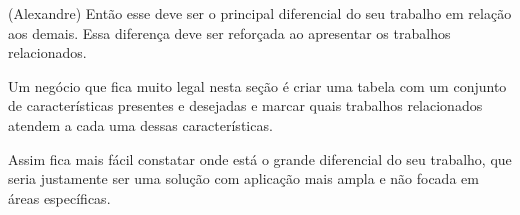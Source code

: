 (Alexandre) Então esse deve ser o principal diferencial do seu trabalho em relação aos demais. Essa diferença deve ser reforçada ao apresentar os trabalhos relacionados.

Um negócio que fica muito legal nesta seção é criar uma tabela com um conjunto de características presentes e desejadas e marcar quais trabalhos relacionados atendem a cada uma dessas características.

Assim fica mais fácil constatar onde está o grande diferencial do seu trabalho, que seria justamente ser uma solução com aplicação mais ampla e não focada em áreas específicas.
